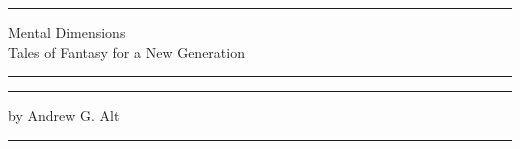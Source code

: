 \thispagestyle{empty}
\begin{center}
	\noindent\rule{\textwidth}{2pt}

	\vspace{10pt}
	{\Huge Mental Dimensions} \\

	\vspace{.5em}
	{\large Tales of Fantasy for a New Generation} \\

	\vspace{.5em}
	\noindent\rule{\textwidth}{2pt}

	\vspace{5in}
	\rule{\textwidth}{2pt}

	\vspace{.5em}
	{\large by Andrew G. Alt}

	\rule{\textwidth}{2pt}
\end{center}
